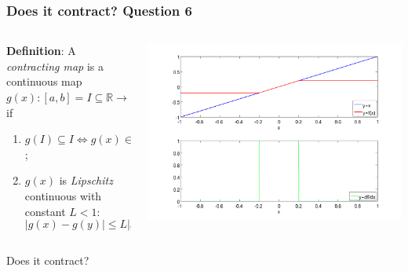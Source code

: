 \documentclass{beamer}
\begin{document}
\begin{frame}
\frametitle{Does it contract? Question 6}

\begin{columns}
    \begin{column}{0.45\textwidth}
  {\bf Definition}: A \emph{contracting map} is a continuous map
  $g(x) : [a, b] = I \subseteq \mathbb{R} \rightarrow \mathbb{R}$ if
\begin{enumerate}
  \item $g(I) \subseteq I \Leftrightarrow g(x) \in I \, \, \, \forall
    x \in I$;
  \item $g(x)$ is \emph{Lipschitz} continuous with constant $L < 1$:
    \begin{equation*}
      | g(x) - g(y) | \leq L | x - y | \, \, \, \forall x, y \in I.
    \end{equation*}
  \end{enumerate}
\end{column}
\begin{column}{0.55\textwidth}
  \begin{center}
   \includegraphics[width=\textwidth]{figures/cmap9}
  \end{center}
\end{column}
\end{columns}
\begin{overlayarea}{\textwidth}{0.1\textheight}
Does it contract?
\end{overlayarea}
\end{frame}
\end{document}
